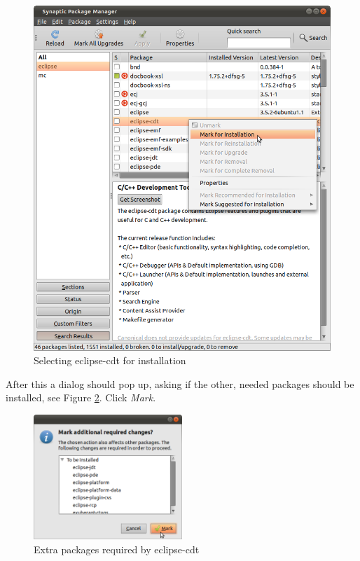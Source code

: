 \documentclass[a4paper, 10pt]{article}
\begin{document}
    \begin{figure}[H]
    \centering
        \includegraphics[width=\textwidth]{./png-install-guide/synaptic-eclipse.png}
        \caption{Selecting eclipse-cdt for installation}
        \label{fig:synaptic-eclipse}
    \end{figure}

After this a dialog should pop up, asking if the other, needed packages should be installed,
see Figure \ref{fig:synaptic-eclipse-extra-packages.png}. Click \emph{Mark}.

    \begin{figure}[H]
    \centering
        \includegraphics[width=0.5\textwidth]{./png-install-guide/synaptic-eclipse-extra-packages.png}
        \caption{Extra packages required by eclipse-cdt}
        \label{fig:synaptic-eclipse-extra-packages.png}
    \end{figure}
\end{document}
